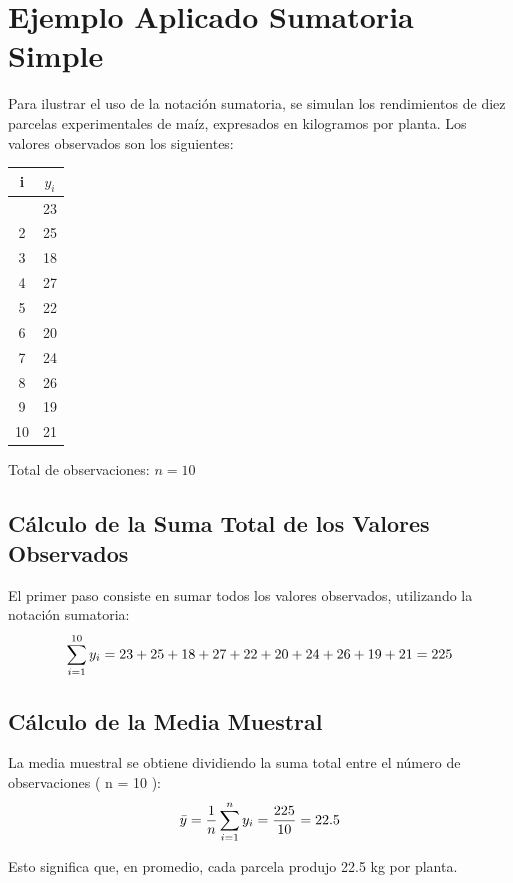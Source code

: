 \documentclass[
  spanish,
  letterpaper,
]{book}
\begin{document}

\chapter{Ejemplo Aplicado Sumatoria
Simple}\label{ejemplo-aplicado-sumatoria-simple}

Para ilustrar el uso de la notación sumatoria, se simulan los
rendimientos de diez parcelas experimentales de maíz, expresados en
kilogramos por planta. Los valores observados son los siguientes:

\begin{longtable}[]{@{}cc@{}}
\toprule\noalign{}
i & \(y_i\) \\
\midrule\noalign{}
\endhead
\bottomrule\noalign{}
\endlastfoot
1 & 23 \\
2 & 25 \\
3 & 18 \\
4 & 27 \\
5 & 22 \\
6 & 20 \\
7 & 24 \\
8 & 26 \\
9 & 19 \\
10 & 21 \\
\end{longtable}

Total de observaciones: \(n = 10\)

\section{Cálculo de la Suma Total de los Valores
Observados}\label{cuxe1lculo-de-la-suma-total-de-los-valores-observados}

El primer paso consiste en sumar todos los valores observados,
utilizando la notación sumatoria: \[
\large\sum_{i=1}^{10} y_i = 23 + 25 + 18 + 27 + 22 + 20 + 24 + 26 + 19 + 21 = 225
\]

\section{Cálculo de la Media
Muestral}\label{cuxe1lculo-de-la-media-muestral}

La media muestral se obtiene dividiendo la suma total entre el número de
observaciones ( n = 10 ): \[
\large\bar{y} = \frac{1}{n} \sum_{i=1}^{n} y_i = \frac{225}{10} = 22.5
\]

Esto significa que, en promedio, cada parcela produjo 22.5 kg por
planta.
\end{document}
